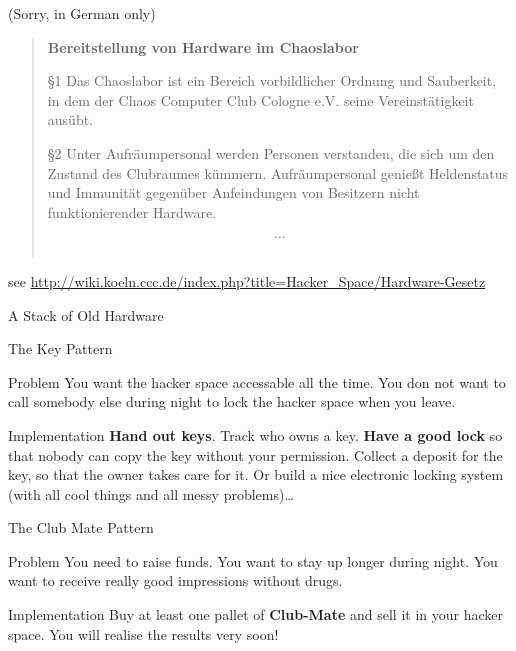 \documentclass[mathserif]{beamer}
\begin{document}
\begin{frame}[plain]{(Sorry, in German only)}
	\begin{quote}
		\textbf{Bereitstellung von Hardware im Chaoslabor}

		§1 Das Chaoslabor ist ein Bereich vorbildlicher Ordnung und Sauberkeit, in
		dem der Chaos Computer Club Cologne e.V. seine Vereinstätigkeit ausübt.

		§2 Unter Aufräumpersonal werden Personen verstanden, die sich um den
		Zustand des Clubraumes kümmern. Aufräumpersonal genießt Heldenstatus und
		Immunität gegenüber Anfeindungen von Besitzern nicht funktionierender
		Hardware.

		\[…\]\\
	\end{quote}
	see \url{http://wiki.koeln.ccc.de/index.php?title=Hacker_Space/Hardware-Gesetz}
\end{frame}

\begin{frame}[plain]{A Stack of Old Hardware}
	\begin{center}
	\end{center}
\end{frame}

\begin{frame}{The Key Pattern}
	\begin{alertblock}{Problem}
		You want the hacker space accessable all the time.  You don not want to call
		somebody else during night to lock the hacker space when you leave.
	\end{alertblock}
	\pause
	\begin{exampleblock}{Implementation}
		\textbf{Hand out keys}.  Track who owns a key.  \textbf{Have a good
		lock} so that nobody can copy the key without your permission.  Collect a
		deposit for the key, so that the owner takes care for it.  Or build a nice
		electronic locking system (with all cool things and all messy problems)…
	\end{exampleblock}
\end{frame}

\begin{frame}{The Club Mate Pattern}
	\begin{alertblock}{Problem}
		You need to raise funds.  You want to stay up longer during night.  You want
		to receive really good impressions without drugs.
	\end{alertblock}
	\pause
	\begin{exampleblock}{Implementation}
		Buy at least one pallet of \textbf{Club-Mate} and sell it in your hacker
		space.  You will realise the results very soon!
	\end{exampleblock}
\end{frame}
\end{document}
